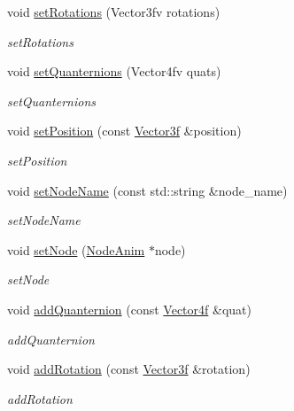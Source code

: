 \begin{DoxyCompactItemize}
\item 
void \hyperlink{classEngine_1_1NodeAnim_a02d79743ef4d9d737a2f290b78d765f8}{set\+Rotations} (Vector3fv rotations)
\begin{DoxyCompactList}\small\item\em set\+Rotations \end{DoxyCompactList}\item 
void \hyperlink{classEngine_1_1NodeAnim_a064b09fb930a538fb036fef21ff2f664}{set\+Quanternions} (Vector4fv quats)
\begin{DoxyCompactList}\small\item\em set\+Quanternions \end{DoxyCompactList}\item 
void \hyperlink{classEngine_1_1NodeAnim_a3dfddcefed0d6a2b11349ae5ea23b64f}{set\+Position} (const \hyperlink{classVector3}{Vector3f} \&position)
\begin{DoxyCompactList}\small\item\em set\+Position \end{DoxyCompactList}\item 
void \hyperlink{classEngine_1_1NodeAnim_acdf7bba9515196eec89dca3b3555d13c}{set\+Node\+Name} (const std\+::string \&node\+\_\+name)
\begin{DoxyCompactList}\small\item\em set\+Node\+Name \end{DoxyCompactList}\item 
void \hyperlink{classEngine_1_1NodeAnim_a9a1a94bf9e53180a3810f90685998688}{set\+Node} (\hyperlink{classEngine_1_1NodeAnim}{Node\+Anim} $\ast$node)
\begin{DoxyCompactList}\small\item\em set\+Node \end{DoxyCompactList}\item 
void \hyperlink{classEngine_1_1NodeAnim_aa9fb2456baafae8281c6ea64a45f1176}{add\+Quanternion} (const \hyperlink{classVector4}{Vector4f} \&quat)
\begin{DoxyCompactList}\small\item\em add\+Quanternion \end{DoxyCompactList}\item 
void \hyperlink{classEngine_1_1NodeAnim_ab2ca08d0111650591bd5ddbf0244e460}{add\+Rotation} (const \hyperlink{classVector3}{Vector3f} \&rotation)
\begin{DoxyCompactList}\small\item\em add\+Rotation \end{DoxyCompactList}\item 

\end{DoxyCompactItemize}

